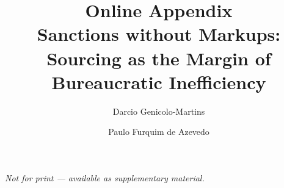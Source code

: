 \documentclass[11pt]{elsarticle}
\begin{document}
\begin{frontmatter}
\title{Online Appendix\\[6pt]
\large Sanctions without Markups: Sourcing as the Margin of Bureaucratic Inefficiency}
\author[INSPER]{Darcio Genicolo-Martins}
\author[INSPER]{Paulo Furquim de Azevedo}
\address[INSPER]{Insper Institute of Education and Research, S\~ao Paulo, Brazil}
\end{frontmatter}

\noindent\textit{Not for print --- available as supplementary material.}

\bigskip


\end{document}
